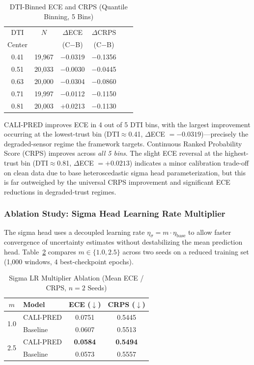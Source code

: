 \documentclass[journal]{IEEEtran}
\begin{document}
\begin{table}[htbp]
\centering
\caption{DTI-Binned ECE and CRPS (Quantile Binning, 5 Bins)}
\label{tab:dti_binned}
\begin{tabular}{cccccc}
\toprule
DTI & $N$ & $\Delta$ECE & $\Delta$CRPS \\
Center & & (C$-$B) & (C$-$B) \\
\midrule
0.41 & 19{,}967 & $-$0.0319 & $-$0.1356 \\
0.51 & 20{,}033 & $-$0.0030 & $-$0.0445 \\
0.63 & 20{,}000 & $-$0.0304 & $-$0.0860 \\
0.71 & 19{,}997 & $-$0.0112 & $-$0.1150 \\
0.81 & 20{,}003 & $+$0.0213 & $-$0.1130 \\
\bottomrule
\end{tabular}
\end{table}

CALI-PRED improves ECE in 4 out of 5 DTI bins, with the largest improvement occurring at the lowest-trust bin (DTI$\approx$0.41, $\Delta$ECE $= -0.0319$)---precisely the degraded-sensor regime the framework targets. Continuous Ranked Probability Score (CRPS) improves across \emph{all 5 bins}. The slight ECE reversal at the highest-trust bin (DTI$\approx$0.81, $\Delta$ECE $= +0.0213$) indicates a minor calibration trade-off on clean data due to base heteroscedastic sigma head parameterization, but this is far outweighed by the universal CRPS improvement and significant ECE reductions in degraded-trust regimes.

\subsubsection{Ablation Study: Sigma Head Learning Rate Multiplier}
The sigma head uses a decoupled learning rate $\eta_{\sigma} = m \cdot \eta_{\text{base}}$ to allow faster convergence of uncertainty estimates without destabilizing the mean prediction head. Table~\ref{tab:ablation_sigma} compares $m \in \{1.0, 2.5\}$ across two seeds on a reduced training set (1{,}000 windows, 4 best-checkpoint epochs).

\begin{table}[htbp]
\centering
\caption{Sigma LR Multiplier Ablation (Mean ECE / CRPS, $n=2$ Seeds)}
\label{tab:ablation_sigma}
\begin{tabular}{clcc}
\toprule
$m$ & Model & ECE ($\downarrow$) & CRPS ($\downarrow$) \\
\midrule
\multirow{2}{*}{1.0} & CALI-PRED & 0.0751 & 0.5445 \\
                      & Baseline  & 0.0607 & 0.5513 \\
\midrule
\multirow{2}{*}{2.5} & CALI-PRED & \textbf{0.0584} & \textbf{0.5494} \\
                      & Baseline  & 0.0573 & 0.5557 \\
\bottomrule
\end{tabular}
\end{table}
\end{document}
